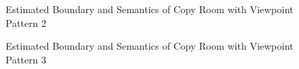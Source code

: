 \documentclass[11pt, a4paper,oneside,chapterprefix=false]{scrbook}
\begin{document}
\begin{figure}[H]
    \centering
      \label{fig:copy b 200 4} \hfill
     \label{fig:copy s 200 4}
    \caption{Estimated Boundary and Semantics of Copy Room with Viewpoint Pattern 2}
    \label{fig:copy 4}
\end{figure}

\begin{figure}[H]
    \centering
      \label{fig:copy b 200 5} \hfill
     \label{fig:copy s 200 5}
    \caption{Estimated Boundary and Semantics of Copy Room with Viewpoint Pattern 3}
    \label{fig:copy 5}
\end{figure}
\end{document}
